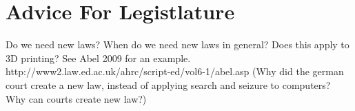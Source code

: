 \section{Advice For Legistlature}

Do we need new laws?  When do we need new laws in general?   Does this apply to
3D printing? See Abel 2009 for an example.
http://www2.law.ed.ac.uk/ahrc/script-ed/vol6-1/abel.asp (Why did the german
court create a new law, instead of applying search and seizure to computers?
Why can courts create new law?)
